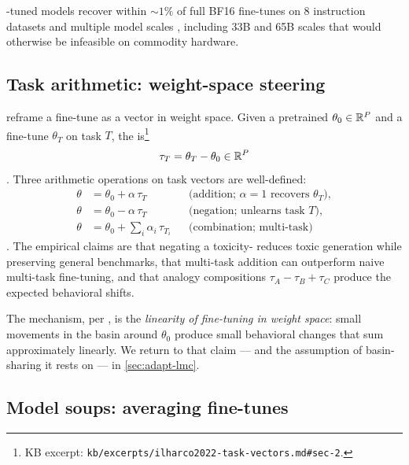 -tuned models recover within $\sim\!1\%$ of full BF16 fine-tunes
on 8 instruction datasets and multiple model scales
\citep[\S 4]{dettmers2023-qlora}, including 33B and 65B scales that
would otherwise be infeasible on commodity hardware.

\subsection{Task arithmetic: weight-space steering}
\label{sec:adapt-taskvec}

\citet{ilharco2022-task-vectors} reframe a fine-tune as a vector in
weight space. Given a pretrained $\theta_0 \in \mathbb{R}^P$ and a fine-tune
$\theta_T$ on task $T$, the \emph{} is\footnote{KB excerpt:
\nolinkurl{kb/excerpts/ilharco2022-task-vectors.md#sec-2}.}
\begin{equation}
\tau_T = \theta_T - \theta_0 \in \mathbb{R}^P
\label{eq:task-vector}
\end{equation}
\citep[\S 2]{ilharco2022-task-vectors}. Three arithmetic operations on
task vectors are well-defined:
\begin{align}
\theta &= \theta_0 + \alpha\, \tau_T && \text{(addition; $\alpha = 1$ recovers $\theta_T$)}, \label{eq:tv-add}\\
\theta &= \theta_0 - \alpha\, \tau_T && \text{(negation; unlearns task $T$)}, \label{eq:tv-neg}\\
\theta &= \theta_0 + \sum_i \alpha_i\, \tau_{T_i} && \text{(combination; multi-task)} \label{eq:tv-combine}
\end{align}
\citep[\S 2]{ilharco2022-task-vectors}. The empirical claims
\citep[\S 3]{ilharco2022-task-vectors} are that negating a
toxicity- reduces toxic generation while preserving general
benchmarks, that multi-task addition can outperform naive multi-task
fine-tuning, and that analogy compositions $\tau_A - \tau_B + \tau_C$
produce the expected behavioral shifts.

The mechanism, per \citet[\S 4]{ilharco2022-task-vectors}, is the
\emph{linearity of fine-tuning in weight space}: small movements in
the basin around $\theta_0$ produce small behavioral changes that sum
approximately linearly. We return to that claim — and the
assumption of basin-sharing it rests on — in \cref{sec:adapt-lmc}.

\subsection{Model soups: averaging fine-tunes}
\label{sec:adapt-soups}

